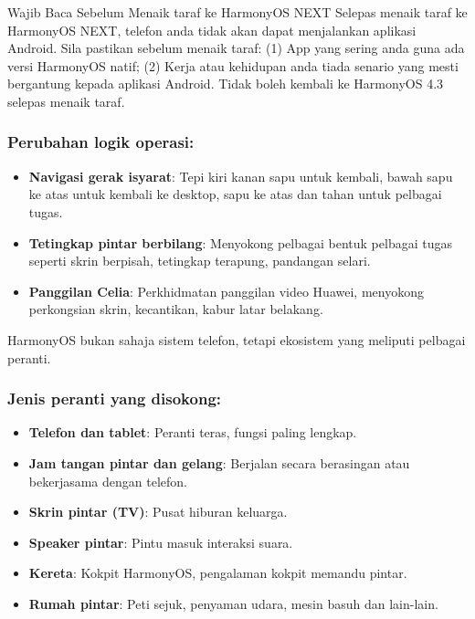\begin{tcbwarn}{Wajib Baca Sebelum Menaik taraf ke HarmonyOS NEXT}
Selepas menaik taraf ke HarmonyOS NEXT, telefon anda tidak akan dapat menjalankan aplikasi Android. Sila pastikan sebelum menaik taraf: (1) App yang sering anda guna ada versi HarmonyOS natif; (2) Kerja atau kehidupan anda tiada senario yang mesti bergantung kepada aplikasi Android. Tidak boleh kembali ke HarmonyOS 4.3 selepas menaik taraf.

\end{tcbwarn}

\subsubsection*{Perubahan logik operasi:}

\begin{itemize}
  \item \textbf{Navigasi gerak isyarat}: Tepi kiri kanan sapu untuk kembali, bawah sapu ke atas untuk kembali ke desktop, sapu ke atas dan tahan untuk pelbagai tugas.
  \item \textbf{Tetingkap pintar berbilang}: Menyokong pelbagai bentuk pelbagai tugas seperti skrin berpisah, tetingkap terapung, pandangan selari.
  \item \textbf{Panggilan Celia}: Perkhidmatan panggilan video Huawei, menyokong perkongsian skrin, kecantikan, kabur latar belakang.
\end{itemize}


HarmonyOS bukan sahaja sistem telefon, tetapi ekosistem yang meliputi pelbagai peranti.

\subsubsection*{Jenis peranti yang disokong:}

\begin{itemize}
  \item \textbf{Telefon dan tablet}: Peranti teras, fungsi paling lengkap.
  \item \textbf{Jam tangan pintar dan gelang}: Berjalan secara berasingan atau bekerjasama dengan telefon.
  \item \textbf{Skrin pintar (TV)}: Pusat hiburan keluarga.
  \item \textbf{Speaker pintar}: Pintu masuk interaksi suara.
  \item \textbf{Kereta}: Kokpit HarmonyOS, pengalaman kokpit memandu pintar.
  \item \textbf{Rumah pintar}: Peti sejuk, penyaman udara, mesin basuh dan lain-lain.
\end{itemize}


